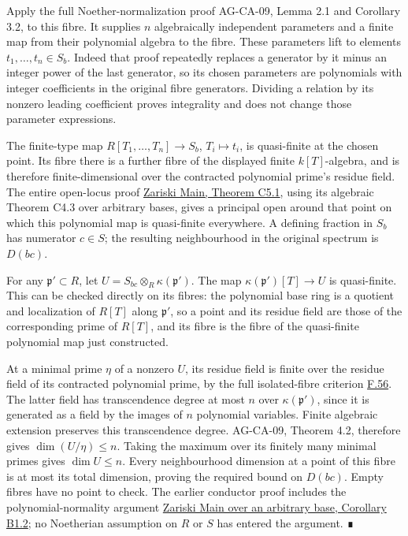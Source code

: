 \documentclass[11pt,a4paper,openany]{report}
\begin{document}
Apply the full Noether-normalization proof AG-CA-09, Lemma 2.1 and Corollary 3.2, to this fibre. It supplies \(n\) algebraically independent parameters and a finite map from their polynomial algebra to the fibre. These parameters lift to elements \(t_1,\ldots,t_n\in S_b\). Indeed that proof repeatedly replaces a generator by it minus an integer power of the last generator, so its chosen parameters are polynomials with integer coefficients in the original fibre generators. Dividing a relation by its nonzero leading coefficient proves integrality and does not change those parameter expressions.

The finite-type map \(R[T_1,\ldots,T_n]\to S_b\), \(T_i\mapsto t_i\), is quasi-finite at the chosen point. Its fibre there is a further fibre of the displayed finite \(k[T]\)-algebra, and is therefore finite-dimensional over the contracted polynomial prime's residue field. The entire open-locus proof \href{https://github.com/KokunoYumeto/open-math-courses/blob/main/docs/courses/AG-RG/AG-RG-S04.md}{Zariski Main, Theorem C5.1}, using its algebraic Theorem C4.3 over arbitrary bases, gives a principal open around that point on which this polynomial map is quasi-finite everywhere. A defining fraction in \(S_b\) has numerator \(c\in S\); the resulting neighbourhood in the original spectrum is \(D(bc)\).

For any \(\mathfrak p'\subset R\), let \(U=S_{bc}\otimes_R\kappa(\mathfrak p')\). The map \(\kappa(\mathfrak p')[T]\to U\) is quasi-finite. This can be checked directly on its fibres: the polynomial base ring is a quotient and localization of \(R[T]\) along \(\mathfrak p'\), so a point and its residue field are those of the corresponding prime of \(R[T]\), and its fibre is the fibre of the quasi-finite polynomial map just constructed.

At a minimal prime \(\eta\) of a nonzero \(U\), its residue field is finite over the residue field of its contracted polynomial prime, by the full isolated-fibre criterion \hyperref[AG-RG-S05-algebra-lemma-isolated-point-fibre]{F.56}. The latter field has transcendence degree at most \(n\) over \(\kappa(\mathfrak p')\), since it is generated as a field by the images of \(n\) polynomial variables. Finite algebraic extension preserves this transcendence degree. AG-CA-09, Theorem 4.2, therefore gives \(\dim(U/\eta)\leq n\). Taking the maximum over its finitely many minimal primes gives \(\dim U\leq n\). Every neighbourhood dimension at a point of this fibre is at most its total dimension, proving the required bound on \(D(bc)\). Empty fibres have no point to check. The earlier conductor proof includes the polynomial-normality argument \href{https://github.com/KokunoYumeto/open-math-courses/blob/main/docs/courses/AG-RG/AG-RG-S04.md}{Zariski Main over an arbitrary base, Corollary B1.2}; no Noetherian assumption on \(R\) or \(S\) has entered the argument. ∎
\end{document}
